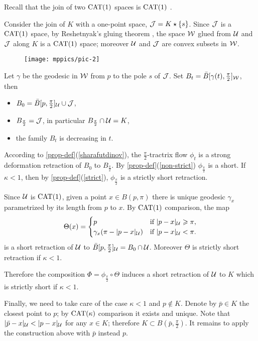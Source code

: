 \documentclass[oneside,a4paper, 12pt]{article}
\begin{document}
Recall that the join of two $\mathrm{CAT}(1)$ spaces is $\mathrm{CAT}(1)$ \cite[Corollary 3.14]{bridson-haefliger}.

Consider the join of  $K$ with a one-point space, $\mathcal{J}=K\star \{s\}$.
Since $\mathcal{J}$ is a $\mathrm{CAT}(1)$ space,
by Reshetnyak's gluing theorem \cite[8.9.1]{akp}, the space $\mathcal{W}$ glued from ${\mathcal{U}}$ and $\mathcal{J}$ along $K$ is a $\mathrm{CAT}(1)$ space;
moreover ${\mathcal{U}}$ and $\mathcal{J}$ are convex subsets in $\mathcal{W}$.

\begin{wrapfigure}{o}{50 mm}
\vskip-0mm
\centering
\texttt{[image: mppics/pic-2]}
\end{wrapfigure} 


Let $\gamma$ be the geodesic in $\mathcal{W}$ from $p$ to the pole $s$ of $\mathcal{J}$.
Set $B_t=\bar B[\gamma(t),\tfrac\pi2]_{\mathcal{W}}$, then
\begin{itemize}
\item $B_0=\bar B[p,\tfrac\pi2]_{\mathcal{U}}\cup \mathcal{J}$,
\item $B_{\frac\pi2}=\mathcal{J}$, in particular $B_{\frac\pi2}\cap \mathcal{U}=K$,
\item the family $B_t$ is decreasing in $t$.
\end{itemize}
According to \ref{prop-def}(\ref{sharafutdinov}), the $\tfrac\pi2$-tractrix flow $\phi_t$ is a strong deformation retraction of $B_0$ to $B_{\frac\pi2}$.
By \ref{prop-def}(\ref{non-strict}) $\phi_{\frac\pi2}$ is a short.
If $\kappa<1$, then by \ref{prop-def}(\ref{strict}), $\phi_{\frac\pi2}$ is a strictly short retraction.

Since ${\mathcal{U}}$ is $\mathrm{CAT}(1)$,
given a point $x\in B(p,\pi)$ there is unique geodesic $\gamma_x$ parametrized by its length from $p$ to $x$. 
By $\mathrm{CAT}(1)$ comparison, the map 
\[\Theta(x)=
\begin{cases}
p&\text{if\ }|p-x|_{\mathcal{U}}\geqslant \pi,
\\
\gamma_x(\pi-|p-x|_{\mathcal{U}})&\text{if\ }|p-x|_{\mathcal{U}}< \pi.
\end{cases}
\]
is a short retraction of ${\mathcal{U}}$ to $\bar B[p,\tfrac\pi2]_{\mathcal{U}}=B_0\cap \mathcal{U}$.
Moreover $\Theta$ is strictly short retraction if $\kappa<1$.

Therefore the composition $\Phi=\phi_{\frac\pi2}\circ\Theta$ induces a short retraction of ${\mathcal{U}}$ to $K$
which is strictly short if $\kappa<1$.

Finally, we need to take care of the case $\kappa<1$ and $p\notin K$.
Denote by $\bar p\in K$ the closest point to $p$; by $\mathrm{CAT}(\kappa)$ comparison it exists and unique.
Note that $|\bar p-x|_{\mathcal{U}}< |p-x|_{\mathcal{U}}$ for any $x\in K$;
therefore $K\subset B(\bar p,\tfrac\pi2)$. 
It remains to apply the construction above with $\bar p$ instead $p$.
\qeds
\end{document}
